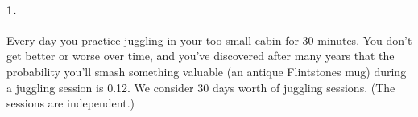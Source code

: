 


\renewcommand\assignment{Worksheet 11, Due Monday, February 13, 4:15pm}


    \iffalse
    \begin{equation*}
        \begin{gathered}
            Equations go here.
        \end{gathered}
    \end{equation*}

    \resizebox{\hsize}{!}{$Long equation goes here$}

    \begin{multicol*}{# of columns}
    \end{multicol*}

    \horizontal

    \fi


    \paragraph*{1.}
    Every day you practice juggling in your too-small cabin for 30 minutes. You don't get better or worse over time, and you've discovered after many years that the probability you'll smash something valuable (an antique Flintstones mug) during a juggling session is 0.12. We consider 30 days worth of juggling sessions. (The sessions are independent.)

